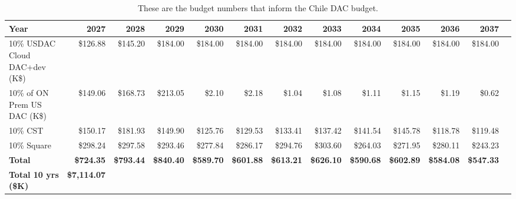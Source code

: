 \tiny \begin{longtable} {|l  |r  |r  |r  |r  |r  |r  |r  |r  |r  |r  |r  |r |} \caption{These are the budget numbers that inform the Chile DAC budget.  \label{tab:chileCalc}}\\ 
\hline 
\textbf{Year}&\textbf{2027}&\textbf{2028}&\textbf{2029}&\textbf{2030}&\textbf{2031}&\textbf{2032}&\textbf{2033}&\textbf{2034}&\textbf{2035}&\textbf{2036}&\textbf{2037} \\ \hline
{10\% USDAC Cloud DAC+dev (K\$)}&{\$126.88}&{\$145.20}&{\$184.00}&{\$184.00}&{\$184.00}&{\$184.00}&{\$184.00}&{\$184.00}&{\$184.00}&{\$184.00}&{\$184.00} \\ \hline
{10\% of ON Prem US DAC (K\$)}&{\$149.06}&{\$168.73}&{\$213.05}&{\$2.10}&{\$2.18}&{\$1.04}&{\$1.08}&{\$1.11}&{\$1.15}&{\$1.19}&{\$0.62} \\ \hline
{10\% CST}&{\$150.17}&{\$181.93}&{\$149.90}&{\$125.76}&{\$129.53}&{\$133.41}&{\$137.42}&{\$141.54}&{\$145.78}&{\$118.78}&{\$119.48} \\ \hline
{10\% Square}&{\$298.24}&{\$297.58}&{\$293.46}&{\$277.84}&{\$286.17}&{\$294.76}&{\$303.60}&{\$264.03}&{\$271.95}&{\$280.11}&{\$243.23} \\ \hline
\textbf{Total}&\textbf{\$724.35}&\textbf{\$793.44}&\textbf{\$840.40}&\textbf{\$589.70}&\textbf{\$601.88}&\textbf{\$613.21}&\textbf{\$626.10}&\textbf{\$590.68}&\textbf{\$602.89}&\textbf{\$584.08}&\textbf{\$547.33} \\ \hline
\textbf{Total 10 yrs (\$K)}&\textbf{\$7,114.07}&&&&&&&&&& \\ \hline
\end{longtable} \normalsize
